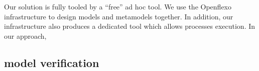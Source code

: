 Our solution is fully tooled by a ``free'' ad hoc tool. We use the Openflexo
infrastructure to design models and metamodels together. In addition, our
infrastructure also produces a dedicated tool which allows processes execution.
In our approach, 

\subsection{model verification}



